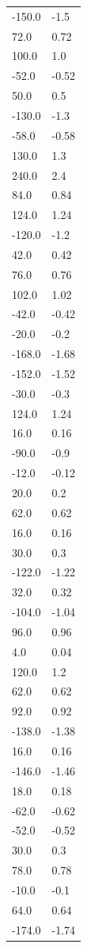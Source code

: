 \begin{longtable}{ll}
-150.0 & -1.5 \\
72.0 & 0.72 \\
100.0 & 1.0 \\
-52.0 & -0.52 \\
50.0 & 0.5 \\
-130.0 & -1.3 \\
-58.0 & -0.58 \\
130.0 & 1.3 \\
240.0 & 2.4 \\
84.0 & 0.84 \\
124.0 & 1.24 \\
-120.0 & -1.2 \\
42.0 & 0.42 \\
76.0 & 0.76 \\
102.0 & 1.02 \\
-42.0 & -0.42 \\
-20.0 & -0.2 \\
-168.0 & -1.68 \\
-152.0 & -1.52 \\
-30.0 & -0.3 \\
124.0 & 1.24 \\
16.0 & 0.16 \\
-90.0 & -0.9 \\
-12.0 & -0.12 \\
20.0 & 0.2 \\
62.0 & 0.62 \\
16.0 & 0.16 \\
30.0 & 0.3 \\
-122.0 & -1.22 \\
32.0 & 0.32 \\
-104.0 & -1.04 \\
96.0 & 0.96 \\
4.0 & 0.04 \\
120.0 & 1.2 \\
62.0 & 0.62 \\
92.0 & 0.92 \\
-138.0 & -1.38 \\
16.0 & 0.16 \\
-146.0 & -1.46 \\
18.0 & 0.18 \\
-62.0 & -0.62 \\
-52.0 & -0.52 \\
30.0 & 0.3 \\
78.0 & 0.78 \\
-10.0 & -0.1 \\
64.0 & 0.64 \\
-174.0 & -1.74 \\

\end{longtable}
